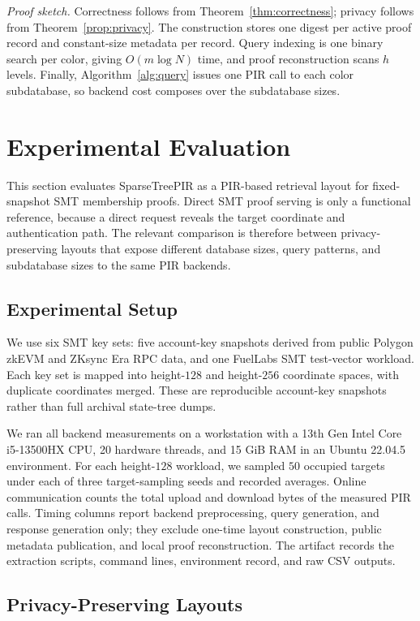 \noindent\emph{Proof sketch.}
Correctness follows from Theorem~\ref{thm:correctness}; privacy follows from Theorem~\ref{prop:privacy}. The construction stores one digest per active proof record and constant-size metadata per record. Query indexing is one binary search per color, giving $O(m\log N)$ time, and proof reconstruction scans $h$ levels. Finally, Algorithm~\ref{alg:query} issues one PIR call to each color subdatabase, so backend cost composes over the subdatabase sizes.


\section{Experimental Evaluation}
\label{sec:experiments}

This section evaluates SparseTreePIR as a PIR-based retrieval layout for fixed-snapshot SMT membership proofs. Direct SMT proof serving is only a functional reference, because a direct request reveals the target coordinate and authentication path. The relevant comparison is therefore between privacy-preserving layouts that expose different database sizes, query patterns, and subdatabase sizes to the same PIR backends.

\subsection{Experimental Setup}

We use six SMT key sets: five account-key snapshots derived from public Polygon zkEVM and ZKsync Era RPC data, and one FuelLabs SMT test-vector workload. Each key set is mapped into height-$128$ and height-$256$ coordinate spaces, with duplicate coordinates merged. These are reproducible account-key snapshots rather than full archival state-tree dumps.

We ran all backend measurements on a workstation with a 13th Gen Intel Core i5-13500HX CPU, 20 hardware threads, and 15 GiB RAM in an Ubuntu 22.04.5 environment. For each height-$128$ workload, we sampled $50$ occupied targets under each of three target-sampling seeds and recorded averages. Online communication counts the total upload and download bytes of the measured PIR calls. Timing columns report backend preprocessing, query generation, and response generation only; they exclude one-time layout construction, public metadata publication, and local proof reconstruction. The artifact records the extraction scripts, command lines, environment record, and raw CSV outputs.

\subsection{Privacy-Preserving Layouts}

